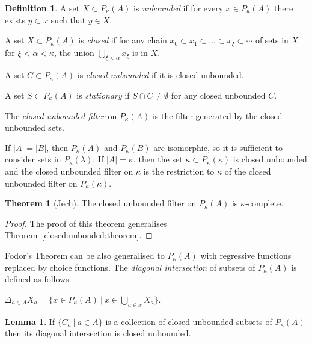 \documentclass[8pt]{article}
\theoremstyle{definition}
\newtheorem{definition}{Definition}[section]
\theoremstyle{definition}
\newtheorem{theorem}{Theorem}[section]
\theoremstyle{definition}
\theoremstyle{definition}
\theoremstyle{definition}
\theoremstyle{definition}
\theoremstyle{definition}
\theoremstyle{definition}
\newtheorem{lemma}{Lemma}[section]
\theoremstyle{definition}
\theoremstyle{definition}
\theoremstyle{definition}
\theoremstyle{definition}
\theoremstyle{definition}
\theoremstyle{definition}
\theoremstyle{question}
\begin{document}
\begin{definition}
A set $X \subset P_{\kappa}(A)$ is \emph{unbounded} if for every $x \in P_{\kappa}(A)$
there exists $y \subset x$ such that $y \in X$.

A set $X \subset P_{\kappa}(A)$ is \emph{closed} if for any chain 
$x_0 \subset x_1 \subset \ldots \subset x_{\xi} \subset \cdots$ of sets in $X$
for $\xi < \alpha < \kappa$, the union $\bigcup \limits_{\xi < \alpha} x_{\xi}$ is in $X$.

A set $C \subset P_{\kappa}(A)$ is \emph{closed unbounded} if it is closed unbounded.

A set $S \subset P_{\kappa}(A)$ is \emph{stationary} if $S \cap C \neq \emptyset$ for any closed unbounded $C$.

The \emph{closed unbounded filter} on $P_{\kappa}(A)$ is the filter generated by the closed unbounded sets.
\end{definition}

If $|A| = |B|$, then $P_{\kappa}(A)$ and $P_{\kappa}(B)$ are isomorphic, so it is sufficient to consider sets in
$P_{\kappa}(\lambda)$. If $|A| = \kappa$, then the set $\kappa \subset P_{\kappa}(\kappa)$
is closed unbounded and the closed unbounded filter on $\kappa$ is the restriction to $\kappa$
of the closed unbounded filter on $P_{\kappa}(\kappa)$.

\begin{theorem}[Jech]
  The closed unbounded filter on $P_{\kappa}(A)$ is $\kappa$-complete.
\end{theorem}

\begin{proof}
The proof of this theorem generalises Theorem~\ref{closed:unbonded:theorem}.
\end{proof}

Fodor's Theorem can be also generalised to $P_{\kappa}(A)$ with regressive functions replaced by choice functions.
The \emph{diagonal intersection} of subsets of $P_{\kappa}(A)$ is defined as follows
\begin{center}
  $\Delta_{a \in A} X_a = \{ x \in P_{\kappa}(A) \: | \: x \in \bigcup \limits_{a \in x} X_a \}$.
\end{center}

\begin{lemma} If $\{ C_a \: | \: a \in A \}$ is a collection of closed unbounded subsets of $P_{\kappa}(A)$
  then its diagonal intersection is closed unbounded.
\end{lemma}
\end{document}
